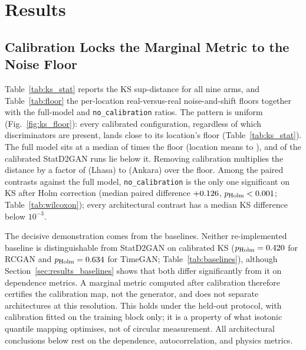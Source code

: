 \documentclass[preprint,12pt]{elsarticle}
\begin{document}
\section{Results}
\label{sec:results}



\subsection{Calibration Locks the Marginal Metric to the Noise Floor}
\label{sec:results_floor}

Table~\ref{tab:ks_stat} reports the KS sup-distance for all nine arms,
and Table~\ref{tab:floor} the per-location real-versus-real noise-and-shift floors
together with the full-model and \texttt{no\_calibration} ratios.
The pattern is uniform (Fig.~\ref{fig:ks_floor}): every calibrated
configuration, regardless of which discriminators are present, lands
close to its location's floor (Table~\ref{tab:ks_stat}).  The full model
sits at a median of \ksRatioFullMedian{} times the floor (location means
\ksRatioFullMin{} to \ksRatioFullMax), and \phKsRatioCellsBelowOne{} of the
\phKsRatioCells{} calibrated StatD2GAN runs lie below it.  Removing calibration multiplies the distance
by a factor of \ksRatioNoCalLhasa{} (Lhasa) to \ksRatioNoCalAnkara{} (Ankara) over the floor.  Among the
\protoNContrastsWord{} paired contrasts against the full model, \texttt{no\_calibration}
is the only one significant on KS after Holm correction (median paired
difference $+0.126$, $p_{\mathrm{Holm}}<0.001$; Table~\ref{tab:wilcoxon}); every
architectural contrast has a median KS difference below $10^{-3}$.

The decisive demonstration comes from the baselines.  Neither
re-implemented baseline is distinguishable from StatD2GAN on calibrated
KS ($p_{\mathrm{Holm}}=0.420$ for RCGAN and
$p_{\mathrm{Holm}}=0.634$ for TimeGAN;
Table~\ref{tab:baselines}), although Section~\ref{sec:results_baselines}
shows that both differ significantly from it on dependence metrics.
A marginal metric computed after calibration therefore certifies the
calibration map, not the generator, and does not separate architectures
at this resolution.  This holds under the held-out protocol, with calibration fitted on the
training block only; it is a property of what isotonic quantile mapping
optimises, not of circular measurement.  All architectural conclusions
below rest on the dependence, autocorrelation, and physics metrics.
\end{document}
